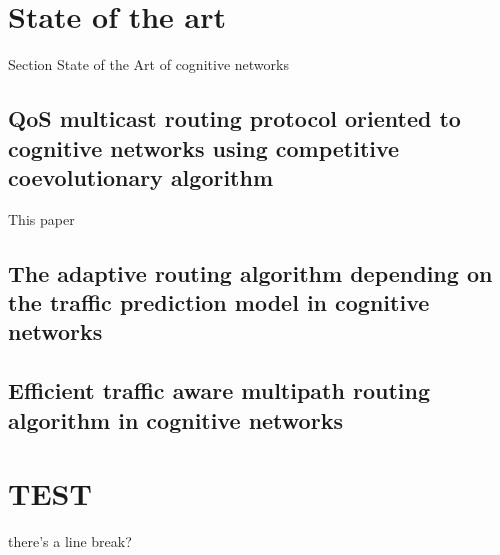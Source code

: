 \section{State of the art}
\label{sec:state}

Section State of the Art of cognitive networks

\subsection{QoS multicast routing protocol oriented to cognitive networks using competitive coevolutionary algorithm}
\label{sec:cogMRT}

This paper \cite{cogMRT}



\subsection{The adaptive routing algorithm depending on the traffic prediction model in cognitive networks}
\label{ATPRA}

\cite{ATPRA}


\subsection{Efficient traffic aware multipath routing algorithm in cognitive networks}
\label{ETAMR}

\cite{ETAMR}


\section{TEST}
there's a line break?